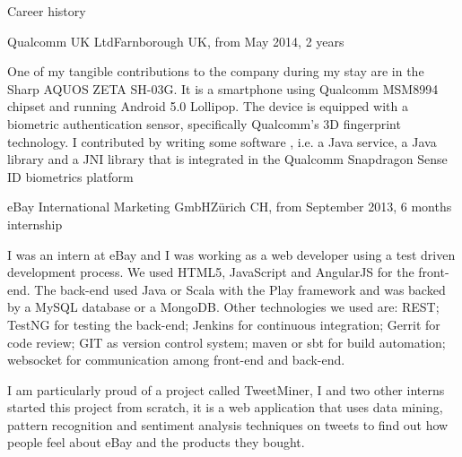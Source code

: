 \documentclass{resume}
\begin{document}
\begin{rSection}{Career history}
\begin{rSubsection}{Qualcomm UK Ltd}{Farnborough UK, from May 2014, 2 years}{}{}

	  
	  
	\item[]
	  One of my tangible contributions to the company during my stay are in the Sharp AQUOS ZETA SH-03G.
	  It is a smartphone using Qualcomm MSM8994 chipset and running Android 5.0 Lollipop. 
	  The device is equipped with a biometric authentication sensor, specifically
	  Qualcomm's 3D fingerprint technology.
	  I contributed by writing some software
	  , i.e. a Java service, a Java library and a JNI library
	  that is integrated in the Qualcomm Snapdragon Sense ID biometrics platform 
    \end{rSubsection}

    \begin{rSubsection}{eBay International Marketing GmbH}{Z\"urich CH, from September 2013, 6 months internship}{}{}
	 \item[]  
	    I was an intern at eBay and I was working as a web developer using a test driven development process. 
	    We used HTML5, JavaScript and AngularJS for the front-end. 
	    The back-end used Java or Scala with the Play framework and was backed by a MySQL database or a MongoDB. 
	    Other technologies we used are: 
	        REST;
	    	TestNG for testing the back-end; 
		Jenkins for continuous integration; 
		Gerrit for code review; 
	    	GIT as version control system; 
		maven or sbt for build automation;
		websocket for communication among front-end and back-end.	  
	  \item[]
	    I am particularly proud of a project called TweetMiner, 
	    I and two other interns started this project from scratch,
	    it is a web application that uses data mining, pattern recognition and sentiment analysis techniques on tweets to find out how people feel about eBay and the products they bought. 
    \end{rSubsection}


\end{rSection}
\end{document}
